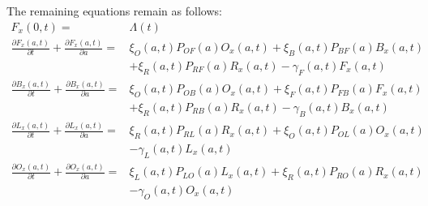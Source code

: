 \documentclass{article}
\begin{document}
The remaining equations remain as follows: 
%
\begin{equation}\begin{array}{rl}
F_{x}(0,t) =& \Lambda(t) \\
%
\frac{\partial F_{x}(a,t)}{\partial t} + \frac{\partial
F_{x}(a,t)}{\partial a} =&
\xi_O(a,t) P_{OF}(a) O_x(a,t)
+ \xi_B(a,t) P_{BF}(a) B_x(a,t)\\ &
 + \xi_R(a,t) P_{RF}(a) R_x(a,t)
- \gamma_F(a,t) F_{x}(a,t)\\
%
%
\frac{\partial B_{x}(a,t)}{\partial t} + \frac{\partial
B_{x}(a,t)}{\partial a} =&  \xi_O(a,t) P_{OB}(a) O_x(a,t) +
\xi_F(a,t) P_{FB}(a) F_x(a,t)\\ &
+ \xi_R(a,t) P_{RB}(a) R_x(a,t) 
- \gamma_B(a,t) B_{x}(a,t)\\
%

\frac{\partial L_{x} (a,t)}{\partial t} + \frac{\partial
L_{x} (a,t)}{\partial a} =& \xi_R(a,t) P_{RL}(a) R_x(a,t) +
\xi_O(a,t) P_{OL}(a) O_x(a,t) \\&
- \gamma_L(a,t) L_{x}(a,t)
\\
%
\frac{\partial O_{x}(a,t)}{\partial t} + \frac{\partial
O_{x}(a,t)}{\partial a} =& \xi_L(a,t) P_{LO}(a) L_x(a,t)
+ \xi_R(a,t) P_{RO}(a) R_x(a,t)
\\&
- \gamma_O(a,t) O_{x}(a,t)
\\
%
\end{array}\end{equation}
%
\end{document}
